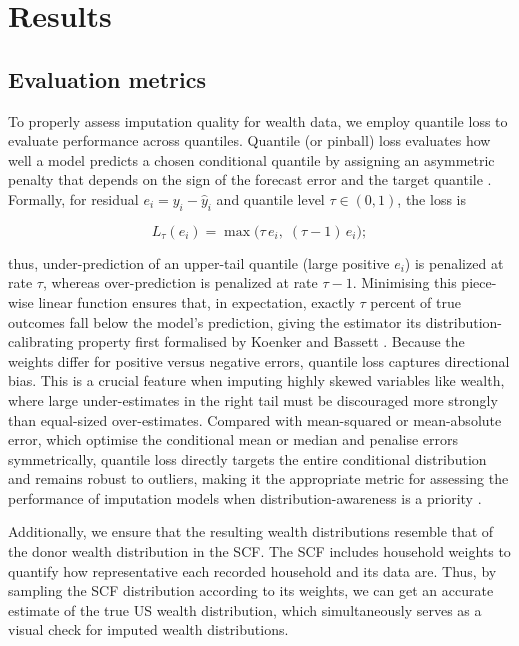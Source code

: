 \section{Results}

\subsection{Evaluation metrics}

To properly assess imputation quality for wealth data, we employ quantile loss to evaluate performance across quantiles. Quantile (or pinball) loss evaluates how well a model predicts a chosen conditional quantile by assigning an asymmetric penalty that depends on the sign of the forecast error and the target quantile \citep{koenker1978regression}. Formally, for residual $e_i = y_i - \hat{y}_i$ and quantile level $\tau\in(0,1)$, the loss is 

$$L_\tau(e_i)=\max\!\bigl(\tau\,e_i,\;(\tau-1)\,e_i\bigr);$$

thus, under-prediction of an upper-tail quantile (large positive $e_i$) is penalized at rate $\tau$, whereas over-prediction is penalized at rate $\tau-1$. Minimising this piece-wise linear function ensures that, in expectation, exactly $\tau$ percent of true outcomes fall below the model's prediction, giving the estimator its distribution-calibrating property first formalised by Koenker and Bassett \citep{koenker1978regression}. Because the weights differ for positive versus negative errors, quantile loss captures directional bias. This is a crucial feature when imputing highly skewed variables like wealth, where large under-estimates in the right tail must be discouraged more strongly than equal-sized over-estimates. Compared with mean-squared or mean-absolute error, which optimise the conditional mean or median and penalise errors symmetrically, quantile loss directly targets the entire conditional distribution and remains robust to outliers, making it the appropriate metric for assessing the performance of imputation models when distribution-awareness is a priority \citep{ghenis2018quantile}.

Additionally, we ensure that the resulting wealth distributions resemble that of the donor wealth distribution in the SCF. The SCF includes household weights to quantify how representative each recorded household and its data are. Thus, by sampling the SCF distribution according to its weights, we can get an accurate estimate of the true US wealth distribution, which simultaneously serves as a visual check for imputed wealth distributions.

